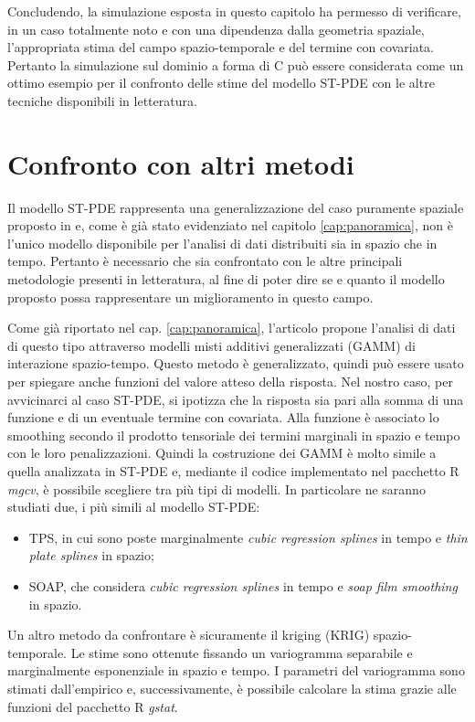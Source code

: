 \documentclass[a4paper,11pt,twoside,openright]{book}							%
\begin{document}
Concludendo, la simulazione esposta in questo capitolo ha permesso di verificare, in un caso totalmente noto e con una dipendenza dalla geometria spaziale, l'appropriata stima del campo spazio-temporale e del termine con covariata. Pertanto la simulazione sul dominio a forma di C può essere considerata come un ottimo esempio per il confronto delle stime del modello ST-PDE con le altre tecniche disponibili in letteratura.


\chapter{Confronto con altri metodi}
\label{cap:confronto}

Il modello ST-PDE rappresenta una generalizzazione del caso puramente spaziale proposto in \cite{art:sangalli} e, come è già stato evidenziato nel capitolo \ref{cap:panoramica}, non è l'unico modello disponibile per l'analisi di dati distribuiti sia in spazio che in tempo. Pertanto è necessario che sia confrontato con le altre principali metodologie presenti in letteratura, al fine di poter dire se e quanto il modello proposto possa rappresentare un miglioramento in questo campo.

Come già riportato nel cap. \ref{cap:panoramica}, l'articolo \cite{art:augustin} propone l'analisi di dati di questo tipo attraverso modelli misti additivi generalizzati (GAMM) di interazione spazio-tempo. Questo metodo è generalizzato, quindi può essere usato per spiegare anche funzioni del valore atteso della risposta. Nel nostro caso, per avvicinarci al caso ST-PDE, si ipotizza che la risposta sia pari alla somma di una funzione e di un eventuale termine con covariata. Alla funzione è associato lo smoothing secondo il prodotto tensoriale dei termini marginali in spazio e tempo con le loro penalizzazioni. Quindi la costruzione dei GAMM è molto simile a quella analizzata in ST-PDE e, mediante il codice implementato nel pacchetto R \textit{mgcv}, è possibile scegliere tra più tipi di modelli. In particolare ne saranno studiati due, i più simili al modello ST-PDE:
\begin{itemize}
\item TPS, in cui sono poste marginalmente \textit{cubic regression splines} in tempo e \textit{thin plate splines} in spazio;
\item SOAP, che considera \textit{cubic regression splines} in tempo e \textit{soap film smoothing} in spazio.
\end{itemize}

Un altro metodo da confrontare è sicuramente il kriging (KRIG) spazio-temporale. Le stime sono ottenute fissando un variogramma separabile e marginalmente esponenziale in spazio e tempo. I parametri del variogramma sono stimati dall'empirico e, successivamente, è possibile calcolare la stima grazie alle funzioni del pacchetto R \textit{gstat}. 
\end{document}
